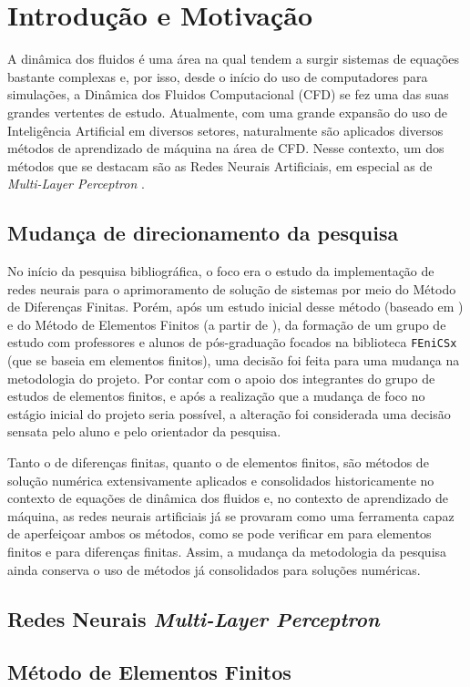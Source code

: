 \section{Introdução e Motivação}

A dinâmica dos fluidos é uma área na qual tendem a surgir sistemas de equações bastante complexas e, por isso, desde o início do uso de computadores para simulações, a Dinâmica dos Fluidos Computacional (CFD) se fez uma das suas grandes vertentes de estudo.
Atualmente, com uma grande expansão do uso de Inteligência Artificial em diversos setores, naturalmente são aplicados diversos métodos de aprendizado de máquina na área de CFD. Nesse contexto, um dos métodos que se destacam são as Redes Neurais Artificiais, em especial as de \textit{Multi-Layer Perceptron} \cite{Sharma2023-fr}.

\subsection{Mudança de direcionamento da pesquisa}
No início da pesquisa bibliográfica, o foco era o estudo da implementação de redes neurais para o aprimoramento de solução de sistemas por meio do Método de Diferenças Finitas.
Porém, após um estudo inicial desse método (baseado em ) e do Método de Elementos Finitos (a partir de ), da formação de um grupo de estudo com professores e alunos de pós-graduação focados na biblioteca \texttt{FEniCSx} (que se baseia em elementos finitos), uma decisão foi feita para uma mudança na metodologia do projeto.
Por contar com o apoio dos integrantes do grupo de estudos de elementos finitos, e após a realização que a mudança de foco no estágio inicial do projeto seria possível, a alteração foi considerada uma decisão sensata pelo aluno e pelo orientador da pesquisa.

Tanto o de diferenças finitas, quanto o de elementos finitos, são métodos de solução numérica extensivamente aplicados e consolidados historicamente no contexto de equações de dinâmica dos fluidos \cite{Thomee1984-sc} e, no contexto de aprendizado de máquina, as redes neurais artificiais já se provaram como uma ferramenta capaz de aperfeiçoar ambos os métodos, como se pode verificar em  para elementos finitos e  para diferenças finitas.
Assim, a mudança da metodologia da pesquisa ainda conserva o uso de métodos já consolidados para soluções numéricas.

\subsection{Redes Neurais \textit{Multi-Layer Perceptron}}

\subsection{Método de Elementos Finitos}